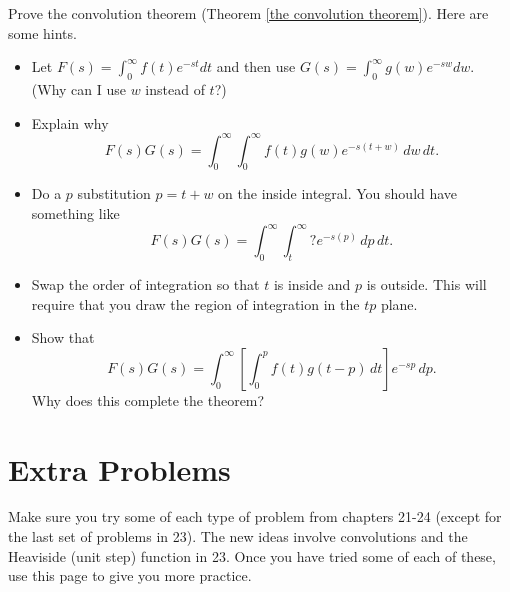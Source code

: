 \begin{problem}
 Prove the convolution theorem (Theorem \ref{the convolution theorem}).  Here are some hints.
\begin{itemize}
 \item Let $F(s) = \int_0^\infty f(t) e^{-st}dt$ and then use $G(s) = \int_0^\infty g(w)e^{-sw}dw$. (Why can I use $w$ instead of $t$?)
 \item Explain why $$F(s)G(s) = \int_0^\infty\int_0^\infty f(t) g(w) e^{-s(t+w)}\, dw\, dt.$$
 \item Do a $p$ substitution $p=t+w$ on the inside integral.  You should have something like 
$$F(s)G(s) = \int_0^\infty\int_t^\infty ?e^{-s(p)}\, dp\, dt.$$
 \item Swap the order of integration so that $t$ is inside and $p$ is outside.  This will require that you draw the region of integration in the $tp$ plane.
 \item Show that 
$$F(s)G(s) = \int_0^\infty\left[\int_0^p f(t) g(t-p) \, dt \right]e^{-sp}\, dp.$$ Why does this complete the theorem?

\end{itemize}

\end{problem}






\section{Extra Problems}
Make sure you try some of each type of problem from chapters 21-24 (except for the last set of problems in 23).  The new ideas involve convolutions and the Heaviside (unit step) function in 23.  Once you have tried some of each of these, use this page to give you more practice.  


